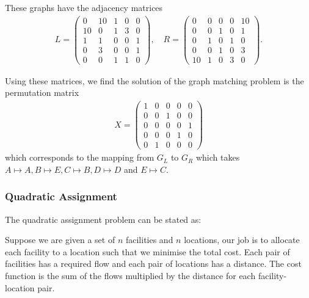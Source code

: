 \documentclass{article}
\begin{document}
\noindent These graphs have the adjacency matrices
\begin{align*}
    L = \begin{pmatrix}
        0 & 10 & 1 & 0 & 0 \\
        10 & 0 & 1 & 3 & 0 \\
        1 & 1 & 0 & 0 & 1 \\
        0 & 3 & 0 & 0 & 1 \\
        0 & 0 & 1 & 1 & 0
    \end{pmatrix}, \quad R = \begin{pmatrix}
        0 & 0 & 0 & 0 & 10 \\
        0 & 0 & 1 & 0 & 1 \\
        0 & 1 & 0 & 1 & 0 \\
        0 & 0 & 1 & 0 & 3 \\
        10 & 1 & 0 & 3 & 0
    \end{pmatrix}.
\end{align*}

\noindent Using these matrices, we find the solution of the graph matching problem is the permutation matrix
\begin{align*}
    X = \begin{pmatrix}
        1 & 0 & 0 & 0 & 0 \\
        0 & 0 & 1 & 0 & 0 \\
        0 & 0 & 0 & 0 & 1 \\
        0 & 0 & 0 & 1 & 0 \\
        0 & 1 & 0 & 0 & 0
    \end{pmatrix}
\end{align*}
which corresponds to the mapping from \(G_L\) to \(G_R\) which takes \(A \mapsto A, B \mapsto E, C \mapsto B, D \mapsto D\) and \(E \mapsto C\).

\subsubsection{Quadratic Assignment}

The quadratic assignment problem can be stated as:

Suppose we are given a set of \(n\) facilities and \(n\) locations, our job is to allocate each facility to a location such that we minimise the total cost. Each pair of facilities has a required flow and each pair of locations has a distance. The cost function is the sum of the flows multiplied by the distance for each facility-location pair.\\
\end{document}

